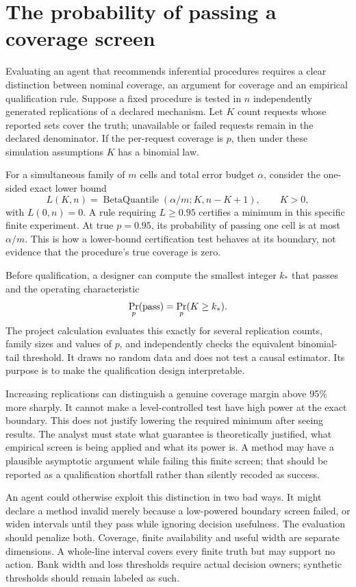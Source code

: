 \section{The probability of passing a coverage screen}
\label{v13:la-screen}

Evaluating an agent that recommends inferential procedures requires a clear
distinction between nominal coverage, an argument for coverage and an empirical
qualification rule. Suppose a fixed procedure is tested in $n$ independently
generated replications of a declared mechanism. Let $K$ count requests whose
reported sets cover the truth; unavailable or failed requests remain in the
declared denominator. If the per-request coverage is $p$, then under these
simulation assumptions $K$ has a binomial law.

For a simultaneous family of $m$ cells and total error budget $\alpha$, consider
the one-sided exact lower bound
\[
 L(K,n)=\operatorname{BetaQuantile}
       (\alpha/m;K,n-K+1),\qquad K>0,
\]
with $L(0,n)=0$. A rule requiring $L\geq0.95$ certifies a minimum in this
specific finite experiment. At true $p=0.95$, its probability of passing one
cell is at most $\alpha/m$. This is how a lower-bound certification test behaves
at its boundary, not evidence that the procedure's true coverage is zero.

Before qualification, a designer can compute the smallest integer $k_*$ that
passes and the operating characteristic
\[
 \Pr_p(\hbox{pass})=\Pr_p(K\geq k_*).
\]
The project calculation evaluates this exactly for several replication counts,
family sizes and values of $p$, and independently checks the equivalent
binomial-tail threshold. It draws no random data and does not test a causal
estimator. Its purpose is to make the qualification design interpretable.
\citep{v13_project_exact}

Increasing replications can distinguish a genuine coverage margin above 95\%
more sharply. It cannot make a level-controlled test have high power at the
exact boundary. This does not justify lowering the required minimum after
seeing results. The analyst must state what guarantee is theoretically justified,
what empirical screen is being applied and what its power is. A method may
have a plausible asymptotic argument while failing this finite screen; that
should be reported as a qualification shortfall rather than silently recoded
as success.

An agent could otherwise exploit this distinction in two bad ways. It might
declare a method invalid merely because a low-powered boundary screen failed,
or widen intervals until they pass while ignoring decision usefulness. The
evaluation should penalize both. Coverage, finite availability and useful width
are separate dimensions. A whole-line interval covers every finite truth but
may support no action. Bank width and loss thresholds require actual decision
owners; synthetic thresholds should remain labeled as such.

